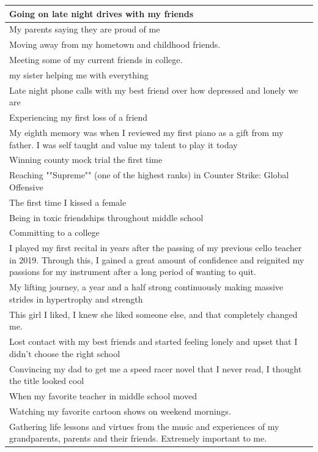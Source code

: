 \documentclass[
  .7em,
  letterpaper,
  DIV=11,
  numbers=noendperiod]{scrartcl}
\begin{document}
\begin{table}
\begin{tabular}{l}
\hline
Going on late night drives with my friends\\
\hline
My parents saying they are proud of me\\
\hline
Moving away from my hometown and childhood friends.\\
\hline
Meeting some of my current friends in college.\\
\hline
my sister helping me with everything\\
\hline
Late night phone calls with my best friend over how depressed and lonely we are\\
\hline
Experiencing my first loss of a friend\\
\hline
My eighth memory was when I reviewed my first piano as a gift from my father. I was self taught and value my talent to play it today\\
\hline
Winning county mock trial the first time\\
\hline
Reaching ""Supreme"" (one of the highest ranks) in Counter Strike: Global Offensive\\
\hline
The first time I kissed a female\\
\hline
Being in toxic friendships throughout middle school\\
\hline
Committing to a college\\
\hline
I played my first recital in years after the passing of my previous cello teacher in 2019. Through this, I gained a great amount of confidence and reignited my passions for my instrument after a long period of wanting to quit.\\
\hline
My lifting journey, a year and a half strong continuously making massive strides in hypertrophy and strength\\
\hline
This girl I liked, I knew she liked someone else, and that completely changed me.\\
\hline
Lost contact with my best friends and started feeling lonely and upset that I didn't choose the right school\\
\hline
Convincing my dad to get me a speed racer novel that I never read, I thought the title looked cool\\
\hline
When my favorite teacher in middle school moved\\
\hline
Watching my favorite cartoon shows on weekend mornings.\\
\hline
Gathering life lessons and virtues from the music and experiences of my grandparents, parents and their friends. Extremely important to me.\\

\end{tabular}
\end{table}
\end{document}
